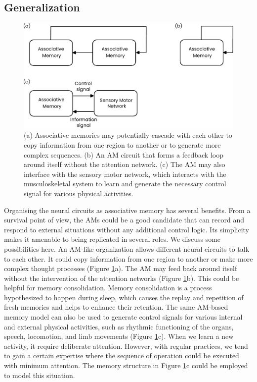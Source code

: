 \documentclass[reprint,amsmath,amssymb,apr,aip,onecolumn, 11pt]{revtex4-1}
\begin{document}
\subsection{Generalization \label{sec:Generalization}}

\begin{figure}[h!]
	\centerline{\includegraphics[width=1\linewidth]{figures/figure_model_generalization.pdf}}
	\caption{(a) Associative memories may potentially cascade with each other to copy information from one region to another or to generate more complex sequences. (b) An AM circuit that forms a feedback loop around itself without the attention network. (c) The AM may also interface with the sensory motor network, which interacts with the musculoskeletal system to learn and generate the necessary control signal for various physical activities. }
	\label{fig:model_generalization}
\end{figure}

Organising the neural circuits as associative memory has several benefits. From a survival point of view, the AMs could be a good candidate that can record and respond to external situations without any additional control logic. Its simplicity makes it amenable to being replicated in several roles. We discuss some possibilities here. An AM-like organization allows different neural circuits to talk to each other. It could copy information from one region to another or make more complex thought processes (Figure \ref{fig:model_generalization}a). The AM may feed back around itself without the intervention of the attention networks (Figure \ref{fig:model_generalization}b). This could be helpful for memory consolidation. Memory consolidation is a process hypothesized to happen during sleep, which causes the replay and repetition of fresh memories and helps to enhance their retention\cite{Diekelmann_2010}.  The same AM-based memory model can also be used to generate control signals for various internal and external physical activities, such as rhythmic functioning of the organs, speech, locomotion, and limb movements (Figure \ref{fig:model_generalization}c). When we learn a new activity, it require deliberate attention. However, with regular practices, we tend to gain a certain expertise where the sequence of operation could be executed with  minimum attention. The memory structure in Figure \ref{fig:model_generalization}c could be employed to model this situation. 
\end{document}
